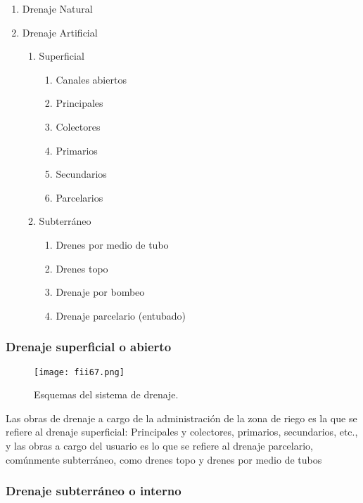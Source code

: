 \begin{enumerate}
	\item Drenaje Natural
	\item Drenaje Artificial
	      \begin{enumerate}
		      \item Superficial
		            \begin{enumerate}
			            \item Canales abiertos
			            \item Principales
			            \item Colectores
			            \item Primarios
			            \item Secundarios
			            \item Parcelarios
		            \end{enumerate}
		      \item Subterráneo
		            \begin{enumerate}
			            \item Drenes por medio de tubo
			            \item Drenes topo
			            \item Drenaje por bombeo
			            \item Drenaje parcelario (entubado)
		            \end{enumerate}
	      \end{enumerate}
\end{enumerate}

\subsubsection{Drenaje superficial o abierto}

\begin{figure}[h!]
	\centerline{\texttt{[image: fii67.png]}}
	\caption{Esquemas del sistema de drenaje.}
	\label{fii67}
\end{figure}

Las obras de drenaje a cargo de la administración de la zona de riego es la que
se refiere al drenaje superficial: Principales y colectores, primarios, secundarios, etc., y
las obras a cargo del usuario es lo que se refiere al drenaje parcelario, comúnmente
subterráneo, como drenes topo y drenes por medio de tubos

\subsubsection{Drenaje subterráneo o interno}


